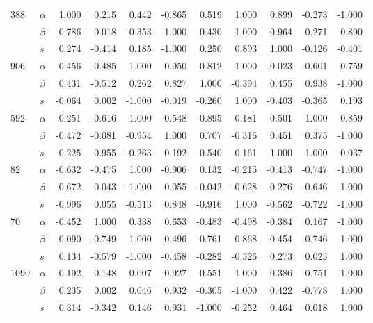 \begin{longtable}{llrrrrrrrrr}
\cline{1-11}
\multirow{3}{*}{388} & $\alpha$ &  1.000 &  0.215 &  0.442 & -0.865 &  0.519 &  1.000 &  0.899 & -0.273 & -1.000 \\
     & $\beta$ & -0.786 &  0.018 & -0.353 &  1.000 & -0.430 & -1.000 & -0.964 &  0.271 &  0.890 \\
     & $s$ &  0.274 & -0.414 &  0.185 & -1.000 &  0.250 &  0.893 &  1.000 & -0.126 & -0.401 \\
\cline{1-11}
\multirow{3}{*}{906} & $\alpha$ & -0.456 &  0.485 &  1.000 & -0.950 & -0.812 & -1.000 & -0.023 & -0.601 &  0.759 \\
     & $\beta$ &  0.431 & -0.512 &  0.262 &  0.827 &  1.000 & -0.394 &  0.455 &  0.938 & -1.000 \\
     & $s$ & -0.064 &  0.002 & -1.000 & -0.019 & -0.260 &  1.000 & -0.403 & -0.365 &  0.193 \\
\cline{1-11}
\multirow{3}{*}{592} & $\alpha$ &  0.251 & -0.616 &  1.000 & -0.548 & -0.895 &  0.181 &  0.501 & -1.000 &  0.859 \\
     & $\beta$ & -0.472 & -0.081 & -0.954 &  1.000 &  0.707 & -0.316 &  0.451 &  0.375 & -1.000 \\
     & $s$ &  0.225 &  0.955 & -0.263 & -0.192 &  0.540 &  0.161 & -1.000 &  1.000 & -0.037 \\
\cline{1-11}
\multirow{3}{*}{82} & $\alpha$ & -0.632 & -0.475 &  1.000 & -0.906 &  0.132 & -0.215 & -0.413 & -0.747 & -1.000 \\
     & $\beta$ &  0.672 &  0.043 & -1.000 &  0.055 & -0.042 & -0.628 &  0.276 &  0.646 &  1.000 \\
     & $s$ & -0.996 &  0.055 & -0.513 &  0.848 & -0.916 &  1.000 & -0.562 & -0.722 & -1.000 \\
\cline{1-11}
\multirow{3}{*}{70} & $\alpha$ & -0.452 &  1.000 &  0.338 &  0.653 & -0.483 & -0.498 & -0.384 &  0.167 & -1.000 \\
     & $\beta$ & -0.090 & -0.749 &  1.000 & -0.496 &  0.761 &  0.868 & -0.454 & -0.746 & -1.000 \\
     & $s$ &  0.134 & -0.579 & -1.000 & -0.458 & -0.282 & -0.326 &  0.273 &  0.023 &  1.000 \\
\cline{1-11}
\multirow{3}{*}{1090} & $\alpha$ & -0.192 &  0.148 &  0.007 & -0.927 &  0.551 &  1.000 & -0.386 &  0.751 & -1.000 \\
     & $\beta$ &  0.235 &  0.002 &  0.046 &  0.932 & -0.305 & -1.000 &  0.422 & -0.778 &  1.000 \\
     & $s$ &  0.314 & -0.342 &  0.146 &  0.931 & -1.000 & -0.252 &  0.464 &  0.018 &  1.000 \\
\end{longtable}
